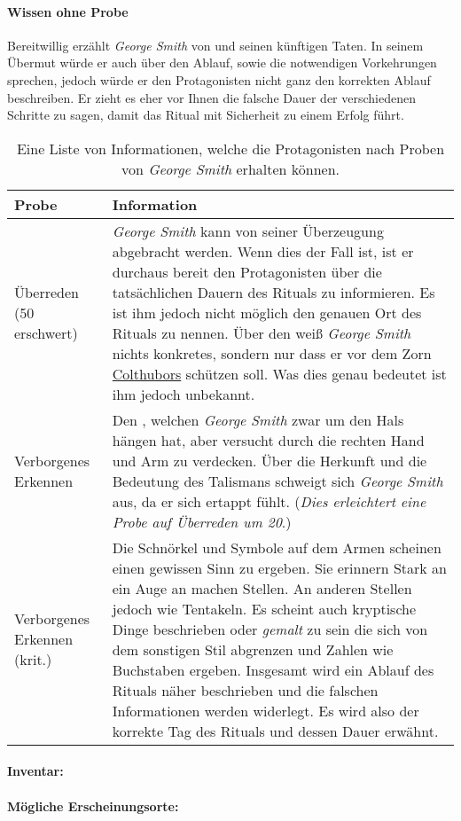         \paragraph{Wissen ohne Probe}
            Bereitwillig erzählt \emph{George Smith} von  und seinen künftigen Taten. In seinem Übermut würde er auch über den Ablauf, sowie die notwendigen Vorkehrungen sprechen, jedoch würde er den Protagonisten nicht ganz den korrekten Ablauf beschreiben. Er zieht es eher vor Ihnen die falsche Dauer der verschiedenen Schritte zu sagen, damit das Ritual mit Sicherheit zu einem Erfolg führt.

            \begin{table}[H]
                \begin{tabularx}{\textwidth}{|l|X|}
                    \hline
                    Probe & Information \\ \hline
                    Überreden (50 erschwert) & \emph{George Smith} kann von seiner Überzeugung abgebracht werden. Wenn dies der Fall ist, ist er durchaus bereit den Protagonisten über die tatsächlichen Dauern des Rituals zu informieren. Es ist ihm jedoch nicht möglich den genauen Ort des Rituals zu nennen. Über den \nameref{items:talisman-von-kor} weiß \emph{George Smith} nichts konkretes, sondern nur dass er vor dem Zorn \hyperref[pers:colthubor]{Colthubors} schützen soll. Was dies genau bedeutet ist ihm jedoch unbekannt.\\ \hline
                    Verborgenes Erkennen & Den \nameref{items:talisman-von-kor}, welchen \emph{George Smith} zwar um den Hals hängen hat, aber versucht durch die rechten Hand und Arm zu verdecken. Über die Herkunft und die Bedeutung des Talismans schweigt sich \emph{George Smith} aus, da er sich ertappt fühlt. (\emph{Dies erleichtert eine Probe auf \emph{Überreden} um 20}.)\\ \hline
                    Verborgenes Erkennen (krit.) & Die Schnörkel und Symbole auf dem Armen scheinen einen gewissen Sinn zu ergeben. Sie erinnern Stark an ein Auge an machen Stellen. An anderen Stellen jedoch wie Tentakeln. Es scheint auch kryptische Dinge beschrieben oder \emph{gemalt} zu sein die sich von dem sonstigen Stil abgrenzen und Zahlen wie Buchstaben ergeben. Insgesamt wird ein Ablauf des Rituals näher beschrieben und die falschen Informationen werden widerlegt. Es wird also der korrekte Tag des Rituals und dessen Dauer erwähnt. \\ \hline
                \end{tabularx}
                \caption{Eine Liste von Informationen, welche die Protagonisten nach Proben von \emph{George Smith} erhalten können.}
            \end{table}

    \paragraph{Inventar:} 

    \paragraph{Mögliche Erscheinungsorte:} 
    
